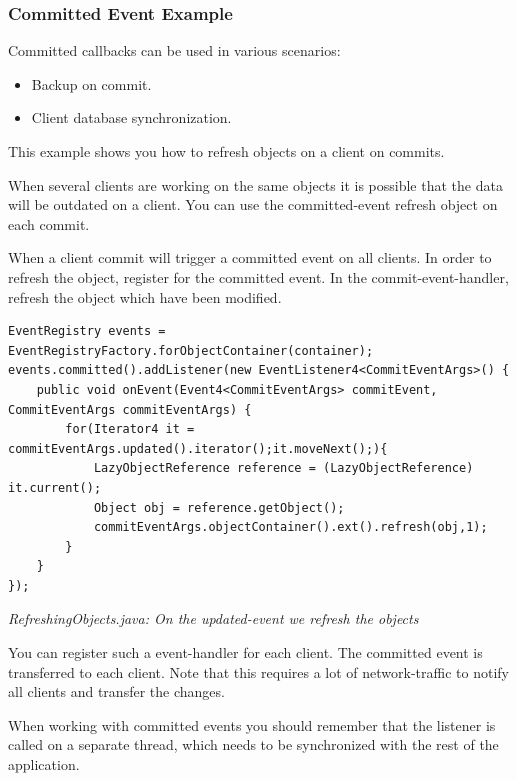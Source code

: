 \subsubsection{Committed Event Example}
\label{ref:advanced-topics-callbacks-possible-usecases-committed-event-example}

Committed callbacks can be used in various scenarios:

\begin{itemize}
\item Backup on commit.
\item Client database synchronization.
\end{itemize}

This example shows you how to refresh objects on a client on commits.

When several clients are working on the same objects it is possible that the data will be outdated on a client. You can use the committed-event refresh object on each commit.

When a client commit will trigger a committed event on all clients. In order to refresh the object, register for the committed event. In the commit-event-handler, refresh the object which have been modified.

\begin{lstlisting}
EventRegistry events = EventRegistryFactory.forObjectContainer(container);
events.committed().addListener(new EventListener4<CommitEventArgs>() {
    public void onEvent(Event4<CommitEventArgs> commitEvent, CommitEventArgs commitEventArgs) {
        for(Iterator4 it = commitEventArgs.updated().iterator();it.moveNext();){
            LazyObjectReference reference = (LazyObjectReference) it.current();
            Object obj = reference.getObject();
            commitEventArgs.objectContainer().ext().refresh(obj,1);
        }
    }
});
\end{lstlisting}

{\small\itshape RefreshingObjects.java: On the updated-event we refresh the objects\par}
\medskip

You can register such a event-handler for each client. The committed event is transferred to each client. Note that this requires a lot of network-traffic to notify all clients and transfer the changes.

When working with committed events you should remember that the listener is called on a separate thread, which needs to be synchronized with the rest of the application.

